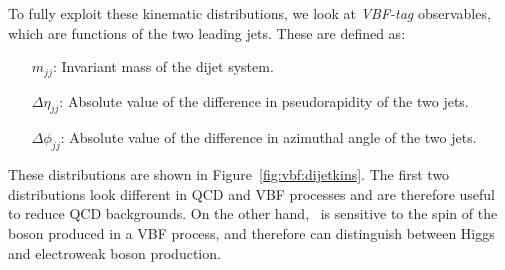 To fully exploit these kinematic distributions, we look at \emph{VBF-tag} observables, which are functions of the two leading jets. 
These are defined as:
\begin{itemize}
    \item[$m_{jj}$:] Invariant mass of the dijet system.
    \item[$\Delta\eta_{jj}$:] Absolute value of the difference in pseudorapidity of the two jets.
    \item[$\Delta\phi_{jj}$:] Absolute value of the difference in azimuthal angle of the two jets.
\end{itemize}
These distributions are shown in Figure~\ref{fig:vbf:dijetkins}.
The first two distributions look different in QCD and VBF processes and are therefore useful to reduce QCD backgrounds.
On the other hand, \dphi~is sensitive to the spin of the boson produced in a VBF process, and therefore can distinguish between Higgs and electroweak boson production.

